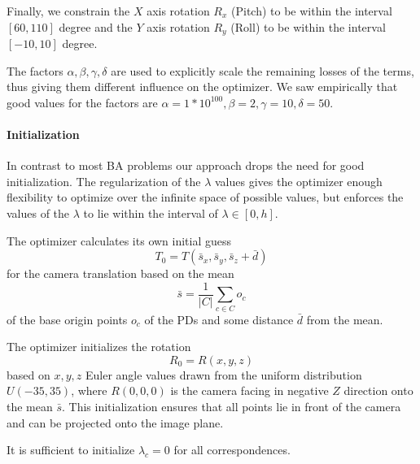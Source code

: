 Finally, we constrain the $X$ axis rotation $R_x$ (Pitch) to be within the interval $[60, 110]$ degree and the $Y$ axis rotation $R_y$ (Roll) to be within the interval $[-10, 10]$ degree.

The factors $\alpha, \beta, \gamma, \delta$ are used to explicitly scale the remaining losses of the terms, thus giving them different influence on the optimizer. 
We saw empirically that good values for the factors are $\alpha = 1*10^{100}, \beta = 2, \gamma = 10, \delta = 50$.

\paragraph{Initialization}
In contrast to most BA problems our approach drops the need for good initialization. 
The regularization of the $\lambda$ values gives the optimizer enough flexibility to optimize over the infinite space of possible values, but enforces the values of the $\lambda$ to lie within the interval of $\lambda \in [0, h]$.

The optimizer calculates its own initial guess
\begin{equation}
  T_0 = T(\bar{s}_x, \bar{s}_y, \bar{s}_z + \bar{d}) 
\end{equation}
for the camera translation based on the mean 
\begin{equation}
  \bar{s} = \frac{1}{\left\lvert C \right\rvert } \sum_{c \in C} o_c
\end{equation}
of the base origin points $o_c$ of the PDs and some distance $\bar{d}$ from the mean.

The optimizer initializes the rotation  
\begin{equation}
  R_0 = R(x, y, z)
\end{equation}
based on $x, y, z$ Euler angle values drawn from the uniform distribution $U(-35, 35)$, where $R(0,0,0)$ is the camera facing in negative $Z$ direction onto the mean $\bar{s}$.
This initialization ensures that all points lie in front of the camera and can be projected onto the image plane.

It is sufficient to initialize $\lambda_c = 0$ for all correspondences.